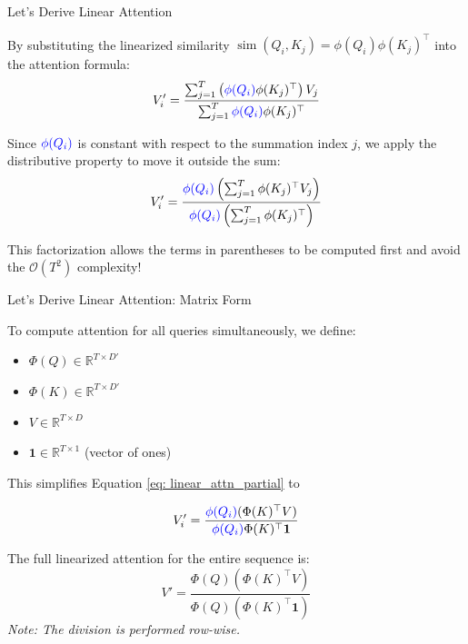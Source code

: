 \documentclass[aspectratio=169]{beamer}
\theoremstyle{definition}
\begin{document}
\begin{frame}{Let's Derive Linear Attention}

By substituting the linearized similarity $\operatorname{sim}(Q_i, K_j) = \phi(Q_i) \phi(K_j)^\top$ into the attention formula:
\begin{equation}
    V'_i = \frac{\sum_{j=1}^{T} \left( \textcolor{blue}{\phi(Q_i)} \phi(K_j)^\top \right) V_j}{\sum_{j=1}^{T} \textcolor{blue}{\phi(Q_i)} \phi(K_j)^\top}
\end{equation}

Since $\textcolor{blue}{\phi(Q_i)}$ is constant with respect to the summation index $j$, we apply the distributive property to move it outside the sum:
\begin{equation}
\label{eq: linear_attn_partial}
    V'_i = \frac{\textcolor{blue}{\phi(Q_i)} \left( \sum_{j=1}^{T} \phi(K_j)^\top V_j \right)}{\textcolor{blue}{\phi(Q_i)} \left( \sum_{j=1}^{T} \phi(K_j)^\top \right)}
\end{equation}

This factorization allows the terms in parentheses to be computed first and avoid the $\mathcal{O}(T^2)$ complexity!


\end{frame}





\begin{frame}{Let's Derive Linear Attention: Matrix Form}

To compute attention for all queries simultaneously, we define:
\begin{itemize}
    \item $\Phi(Q) \in \mathbb{R}^{T \times D'}$
    \item $\Phi(K) \in \mathbb{R}^{T \times D'}$
    \item $V \in \mathbb{R}^{T \times D}$
    \item $\mathbf{1} \in \mathbb{R}^{T \times 1}$ (vector of ones)
\end{itemize}

This simplifies Equation \ref{eq: linear_attn_partial} to 


\begin{equation}
    V'_i = \frac{\textcolor{blue}{\phi(Q_i)}   (\Phi(K)^\top V) }{\textcolor{blue}{\phi(Q_i)} \Phi(K)^\top \mathbf{1}}
\end{equation}


The full linearized attention for the entire sequence is:
\begin{equation}
    V' = \frac{\Phi(Q) \left( \Phi(K)^\top V \right)}{\Phi(Q) \left( \Phi(K)^\top \mathbf{1} \right)}
\end{equation}
\textit{Note: The division is performed row-wise.}

\end{frame}
\end{document}
